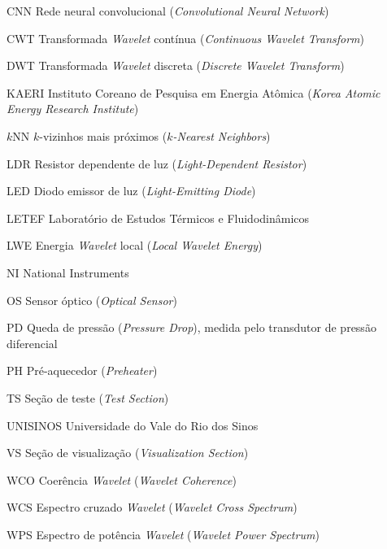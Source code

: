 \listoffigures*
\cleardoublepage

\listofquadros*
\cleardoublepage

\listoftables*
\cleardoublepage

\begin{siglas}
  \item[CNN] Rede neural convolucional (\textit{Convolutional Neural Network})
  \item[CWT] Transformada \textit{Wavelet} contínua (\textit{Continuous Wavelet Transform})
  \item[DWT] Transformada \textit{Wavelet} discreta (\textit{Discrete Wavelet Transform})
  \item[KAERI] Instituto Coreano de Pesquisa em Energia Atômica
  (\textit{Korea Atomic Energy Research Institute})
  \item[$k$NN] $k$-vizinhos mais próximos (\textit{$k$-Nearest Neighbors})
  \item[LDR] Resistor dependente de luz (\textit{Light-Dependent Resistor})
  \item[LED] Diodo emissor de luz (\textit{Light-Emitting Diode})
  \item[LETEF] Laboratório de Estudos Térmicos e Fluidodinâmicos
  \item[LWE] Energia \textit{Wavelet} local (\textit{Local Wavelet Energy})
  \item[NI] National Instruments
  \item[OS] Sensor óptico (\textit{Optical Sensor})
  \item[PD] Queda de pressão (\textit{Pressure Drop}), medida pelo transdutor
  de pressão diferencial
  \item[PH] Pré-aquecedor (\textit{Preheater})
  \item[TS] Seção de teste (\textit{Test Section})
  \item[UNISINOS] Universidade do Vale do Rio dos Sinos
  \item[VS] Seção de visualização (\textit{Visualization Section})
  \item[WCO] Coerência \textit{Wavelet} (\textit{Wavelet Coherence})
  \item[WCS] Espectro cruzado \textit{Wavelet} (\textit{Wavelet Cross Spectrum})
  \item[WPS] Espectro de potência \textit{Wavelet} (\textit{Wavelet Power Spectrum})
\end{siglas}

